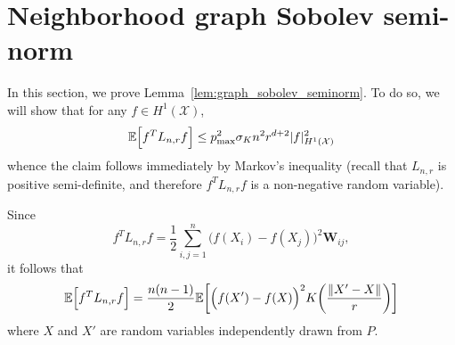 \documentclass[twoside]{article}
\newcommand{\1}{\mathbf{1}}
\newcommand{\Lap}{L}
\newcommand{\Xset}{\mathcal{X}}
\newcommand{\Ebb}{\mathbb{E}}
\theoremstyle{definition}
\theoremstyle{remark}
\begin{document}
\section{Neighborhood graph Sobolev semi-norm}
\label{sec:graph_sobolev_seminorm}
In this section, we prove Lemma~\ref{lem:graph_sobolev_seminorm}. To do so, we will show that for any $f \in H^1(\Xset)$,
\begin{equation*}
\Ebb\Bigl[f^T \Lap_{n,r} f\Bigr] \leq p_{\max}^2 \sigma_K n^2 r^{d + 2} |f|_{H^1(\Xset)}^2
\end{equation*}
whence the claim follows immediately by Markov's inequality (recall that $\Lap_{n,r}$ is positive semi-definite, and therefore $f^T \Lap_{n,r} f$ is a non-negative random variable).

Since
\begin{equation*}
f^T \Lap_{n,r} f = \frac{1}{2}\sum_{i, j = 1}^{n} \bigl(f(X_i) - f(X_j)\bigr)^2 \mathbf{W}_{ij},
\end{equation*}
it follows that
\begin{equation}
\label{pf:first_order_graph_sobolev_seminorm_1}
\Ebb\Bigl[f^T \Lap_{n,r} f\Bigr] = \frac{n(n - 1)}{2} \Ebb\biggl[\Bigl(f(X') - f(X)\Bigr)^2 K\biggl(\frac{\|X' - X\|}{r}\biggr)\biggr]
\end{equation}
where $X$ and $X'$ are random variables independently drawn from $P$. 
\end{document}
